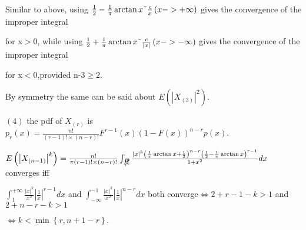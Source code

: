 \documentclass{article}
\def\TEXTsymbol#1{\mbox{$#1$}}%
\def\NEG#1{\leavevmode\hbox{\rlap{\thinspace/}{$#1$}}}%
\begin{document}
Similar to above, using $\frac{1}{2}-\frac{1}{\pi }\arctan x\symbol{126}%
\frac{c}{x}\left( x->+\infty \right) $ gives the convergence of the improper
integral 

for x\TEXTsymbol{>}0, while using $\frac{1}{2}+\frac{1}{\pi }\arctan x%
\symbol{126}\frac{c}{\left\vert x\right\vert }\left( x->-\infty \right) $
gives the convergence of the improper integral 

for x\TEXTsymbol{<}0,provided n-3$\geq 2.$

By symmetry the same can be said about $E\left( \left\vert X_{\left(
3\right) }\right\vert ^{2}\right) .$


$\left( 4\right) $ the pdf of $X_{\left( r\right) }$ is $p_{r}\left(
x\right) =\frac{n!}{\left( r-1\right) !\times \left( n-r\right) !}%
F^{r-1}\left( x\right) \left( 1-F\left( x\right) \right) ^{n-r}p\left(
x\right) .$

$E\left( \left\vert X_{\left( n-1\right) }\right\vert ^{k}\right) =\frac{n!}{%
\pi \left( r-1\right) !\times \left( n-r\right) !}\int_{\NEG{R}}\frac{%
\left\vert x\right\vert ^{k}\left( \frac{1}{\pi }\arctan x+\frac{1}{2}%
\right) ^{n-r}\left( \frac{1}{2}-\frac{1}{\pi }\arctan x\right) ^{r-1}}{%
1+x^{2}}dx$ converges iff 

$\int_{1}^{+\infty }\frac{\left\vert x\right\vert ^{k}}{x^{2}}\left\vert 
\frac{1}{x}\right\vert ^{r-1}dx$ and $\int_{-\infty }^{-1}\frac{\left\vert
x\right\vert ^{k}}{x^{2}}\left\vert \frac{1}{x}\right\vert ^{n-r}dx$ both
converge$\iff 2+r-1-k>1$ and $2+n-r-k>1$

$\iff k<\min \left\{ r,n+1-r\right\} .$ 
\end{document}
